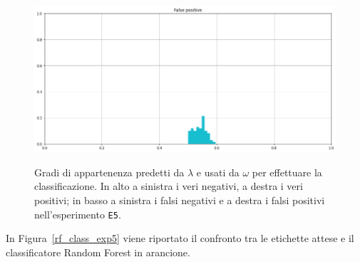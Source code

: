 \documentclass[12pt]{report}
\theoremstyle{definition}
\begin{document}
\begin{figure}
   \begin{minipage}{0.48\textwidth}
     \includegraphics[width=\linewidth]{images/experiment_beta5_sovrapposti/fp.png}\label{fp_b5s}
   \end{minipage}
   \caption{Gradi di appartenenza predetti da $\lambda$ e usati da $\omega$ per effettuare la classificazione. In alto a sinistra i veri negativi, a destra i veri positivi; in basso a sinistra i falsi negativi e a destra i falsi positivi nell'esperimento \texttt{E5}.}
   \label{4cases_exp5}
\end{figure}
In Figura~\ref{rf_class_exp5} viene riportato il confronto tra le etichette attese e il classificatore Random Forest in arancione.
\end{document}
